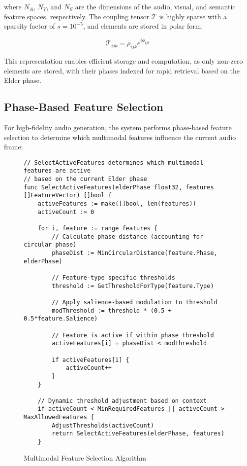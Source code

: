 where $N_A$, $N_V$, and $N_S$ are the dimensions of the audio, visual, and semantic feature spaces, respectively. The coupling tensor $\mathcal{T}$ is highly sparse with a sparsity factor of $s = 10^{-5}$, and elements are stored in polar form:

\begin{equation}
\mathcal{T}_{ijk} = \rho_{ijk}e^{i\phi_{ijk}}
\end{equation}

This representation enables efficient storage and computation, as only non-zero elements are stored, with their phases indexed for rapid retrieval based on the Elder phase.

\subsection{Phase-Based Feature Selection}

For high-fidelity audio generation, the system performs phase-based feature selection to determine which multimodal features influence the current audio frame:

\begin{figure}[h]
\begin{center}
\begin{minipage}{0.95\textwidth}
\begin{verbatim}
// SelectActiveFeatures determines which multimodal features are active
// based on the current Elder phase
func SelectActiveFeatures(elderPhase float32, features []FeatureVector) []bool {
    activeFeatures := make([]bool, len(features))
    activeCount := 0
    
    for i, feature := range features {
        // Calculate phase distance (accounting for circular phase)
        phaseDist := MinCircularDistance(feature.Phase, elderPhase)
        
        // Feature-type specific thresholds
        threshold := GetThresholdForType(feature.Type)
        
        // Apply salience-based modulation to threshold
        modThreshold := threshold * (0.5 + 0.5*feature.Salience)
        
        // Feature is active if within phase threshold
        activeFeatures[i] = phaseDist < modThreshold
        
        if activeFeatures[i] {
            activeCount++
        }
    }
    
    // Dynamic threshold adjustment based on context
    if activeCount < MinRequiredFeatures || activeCount > MaxAllowedFeatures {
        AdjustThresholds(activeCount)
        return SelectActiveFeatures(elderPhase, features)
    }
\end{verbatim}
\end{minipage}
\caption{Multimodal Feature Selection Algorithm}
\end{center}
\end{figure}
    


